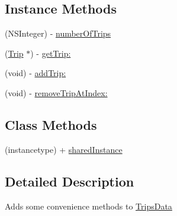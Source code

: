 \subsection*{Instance Methods}
\begin{DoxyCompactItemize}
\item 
(N\-S\-Integer) -\/ \hyperlink{interface_trips_data_aaad503ab67656b4e43ad6227fba6fc59}{number\-Of\-Trips}
\item 
(\hyperlink{interface_trip}{Trip} $\ast$) -\/ \hyperlink{interface_trips_data_a433034d39dff68774a32958007ad5ff1}{get\-Trip\-:}
\item 
(void) -\/ \hyperlink{interface_trips_data_a467bdf7deae8160c6552be65b613d36c}{add\-Trip\-:}
\item 
(void) -\/ \hyperlink{interface_trips_data_a1951cb6a576c4294c680ec94664ca5b0}{remove\-Trip\-At\-Index\-:}
\end{DoxyCompactItemize}
\subsection*{Class Methods}
\begin{DoxyCompactItemize}
\item 
(instancetype) + \hyperlink{interface_trips_data_ac78fc79e8ebd10722f0b9f06df78eb27}{shared\-Instance}
\end{DoxyCompactItemize}


\subsection{Detailed Description}
Adds some convenience methods to \hyperlink{interface_trips_data}{Trips\-Data} 

